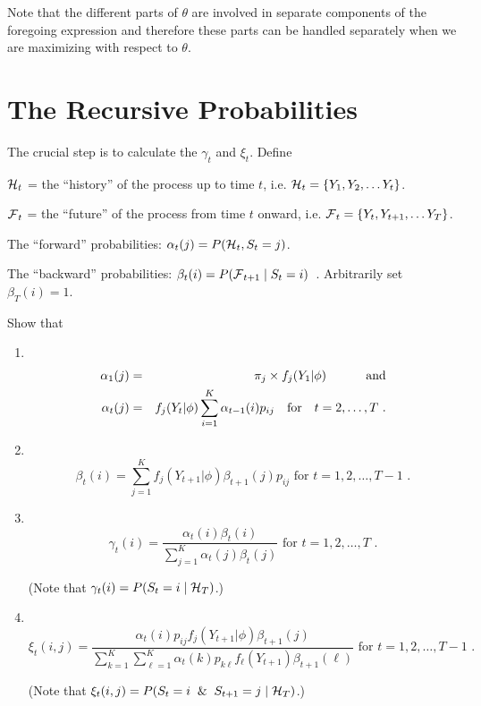Note that the different parts of $\theta$ are involved in separate
components of the foregoing expression and therefore these parts can
be handled separately when we are maximizing with respect to
$\theta$.

\section{The Recursive Probabilities}
The crucial step is to calculate the $\gamma_t$ and $\xi_t$.  Define
\begin{alist}
\item $\mbox{${\cal H}$}_t$ = the ``history'' of the process up to time $t$,
i.e. $\mbox{${\cal H}$}_t = \{Y_1, Y_2, \ldots Y_t\}$.
\item $\mbox{${\cal F}$}_t$ = the ``future'' of the process from time $t$ onward,
i.e. $\mbox{${\cal F}$}_t = \{Y_t, Y_{t+1}, \ldots Y_T\}$.
\item The ``forward'' probabilities:  $\alpha_t(j) = P(\mbox{${\cal H}$}_t, S_t = j)$.
\item The ``backward'' probabilities:  $\beta_t(i) = P(\mbox{${\cal F}$}_{t+1} \;
| \; S_t=i)$\ .  Arbitrarily set $\beta_T(i) = 1$.
\end{alist}

 Show that
\begin{enumerate}
\item \mbox{ } \vspace*{-1.0\baselineskip}
\begin{eqnarray*}
\alpha_1(j) & = & \pi_j \times f_j(Y_1|\phi) \mbox{\hspace*{1cm} and}\\
\alpha_t(j) & = & f_j(Y_t|\phi) \sum_{i=1}^K \alpha_{t-1}(i) p_{ij}
             \mbox{\ \ \ for \ \ } t = 2, \ldots, T \mbox{ .}
\end{eqnarray*}

\item \mbox{ } \vspace*{-1.0\baselineskip}
\[
\beta_t(i) = \sum_{j=1}^K f_j(Y_{t+1}|\phi) \beta_{t+1}(j) p_{ij}
             \mbox{\ \ \ for \ \ } t = 1, 2, \ldots, T-1 \mbox{ .}
\]

\item \mbox{ } \vspace*{-1.0\baselineskip}
\[ \gamma_t(i) =
\frac{\alpha_t(i) \beta_t(i)}{\sum_{j=1}^K \alpha_t(j)
					    \beta_t(j)}
	      \mbox{\ \ \ for \ \ } t = 1, 2, \ldots, T \mbox{ .}
\]

(Note that $\gamma_t(i) = P(S_t=i \; | \; \mbox{${\cal H}$}_T)$.)\\

\item \mbox{ } \vspace*{-1.0\baselineskip}
\[
\xi_t(i,j) = \frac{\alpha_t(i) p_{ij} f_j(Y_{t+1}|\phi) \beta_{t+1}(j)}
                      {\sum_{k=1}^K \sum_{\ell=1}^K \alpha_t(k) p_{k\ell}
                       f_{\ell}(Y_{t+1}) \beta_{t+1}(\ell)}
                       \mbox{\ \ \ for \ \ } t = 1, 2, \ldots, T-1 \mbox{ .}
\]

(Note that $\xi_t(i,j) = P(S_t = i \;\; \& \;\; S_{t+1} = j \;
| \;  \mbox{${\cal H}$}_T)$.)\\
\end{enumerate}

